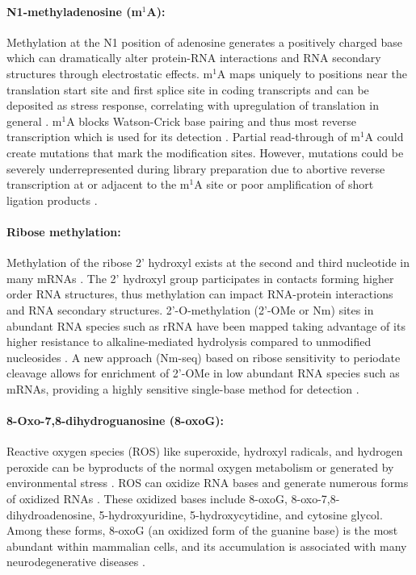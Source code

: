 \paragraph{N1-methyladenosine (m$^1$A):} Methylation at the N1 position of adenosine generates a positively charged base which can dramatically alter protein-RNA interactions and RNA secondary structures through electrostatic effects. m$^1$A maps uniquely to positions near the translation start site and first splice site in coding transcripts and can be deposited as stress response, correlating with upregulation of translation in general \citep{Dominissini2016,Li2016a}. m$^1$A blocks Watson-Crick base pairing and thus most reverse transcription which is used for its detection \citep{Motorin2007}. Partial read-through of m$^1$A could create mutations that mark the modification sites. However, mutations could be severely underrepresented during library preparation due to abortive reverse transcription at or adjacent to the m$^1$A site or poor amplification of short ligation products \citep{Hauenschild2015}. 

\paragraph{Ribose methylation:} Methylation of the ribose 2' hydroxyl exists at the second and third nucleotide in many mRNAs \citep{Schibler1977}. The 2' hydroxyl group  participates in contacts forming higher order RNA structures, thus methylation can impact RNA-protein interactions and RNA secondary structures. 2'-O-methylation (2'-OMe or Nm) sites in abundant RNA species such as rRNA have been mapped taking advantage of its higher resistance to alkaline-mediated hydrolysis compared to unmodified nucleosides \citep{Marchand2016}. A new approach (Nm-seq) based on ribose sensitivity to periodate cleavage allows for enrichment of 2'-OMe in low abundant RNA species such as mRNAs, providing a highly sensitive single-base method for detection \citep{Dai2017}.

\paragraph{8-Oxo-7,8-dihydroguanosine (8-oxoG):} Reactive oxygen species (ROS) like superoxide, hydroxyl radicals, and hydrogen peroxide can be byproducts of the normal oxygen metabolism or generated by environmental stress \citep{Cadet2013}. ROS can oxidize RNA bases and generate numerous forms of oxidized RNAs \citep{Yan2019,Cadet2013}. These oxidized bases include 8-oxoG, 8-oxo-7,8-dihydroadenosine, 5-hydroxyuridine, 5-hydroxycytidine, and cytosine glycol.  Among these forms, 8-oxoG (an oxidized form of the guanine base) is the most abundant within mammalian cells, and its accumulation is associated with many neurodegenerative diseases \citep{Nunomura2017,Poulsen2012}. \\

